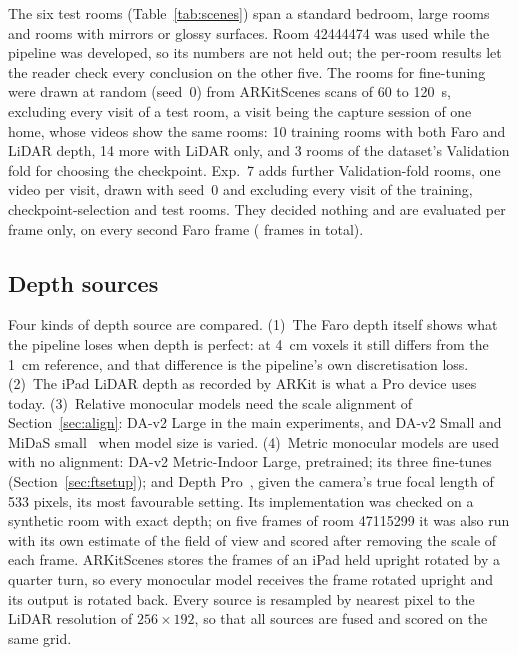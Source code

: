 The six test rooms (Table~\ref{tab:scenes}) span a standard bedroom, large rooms and rooms with mirrors or glossy
surfaces. Room 42444474 was used while the pipeline was developed, so its numbers are not held out; the per-room
results let the reader check every conclusion on the other five. The rooms for fine-tuning were drawn at random
(seed~0) from ARKitScenes scans of 60 to \SI{120}{s}, excluding every visit of a test room, a visit being the capture
session of one home, whose videos show the same rooms: 10 training rooms with both Faro and LiDAR depth, 14 more with
LiDAR only, and 3 rooms of the dataset's Validation fold for choosing the checkpoint. Exp.~7 adds \rsVN{} further
Validation-fold rooms, one video per visit, drawn with seed~0 and excluding every visit of the training,
checkpoint-selection and test rooms. They decided nothing and are evaluated per frame only, on every second Faro frame
(\rsVFRAMES{} frames in total).

\subsection{Depth sources}\label{sec:sources}
Four kinds of depth source are compared. (1)~The Faro depth itself shows what the pipeline loses when depth is perfect:
at \SI{4}{cm} voxels it still differs from the \SI{1}{cm} reference, and that difference is the pipeline's own
discretisation loss. (2)~The iPad LiDAR depth as recorded by ARKit is what a Pro device uses today. (3)~Relative
monocular models need the scale alignment of Section~\ref{sec:align}: DA-v2 Large in the main experiments, and DA-v2
Small and MiDaS small~\cite{midas} when model size is varied. (4)~Metric monocular models are used with no alignment:
DA-v2 Metric-Indoor Large, pretrained; its three fine-tunes (Section~\ref{sec:ftsetup}); and Depth Pro~\cite{depthpro},
given the camera's true focal length of 533 pixels, its most favourable setting. Its implementation was checked on
a synthetic room with exact depth; on five frames of room 47115299 it was also run with its own estimate of the field
of view and scored after removing the scale of each frame. ARKitScenes stores the frames of an
iPad held upright rotated by a quarter turn, so every monocular model receives the frame rotated upright and its output
is rotated back. Every source is resampled by nearest pixel to the LiDAR resolution of $256\times192$, so that all
sources are fused and scored on the same grid.

